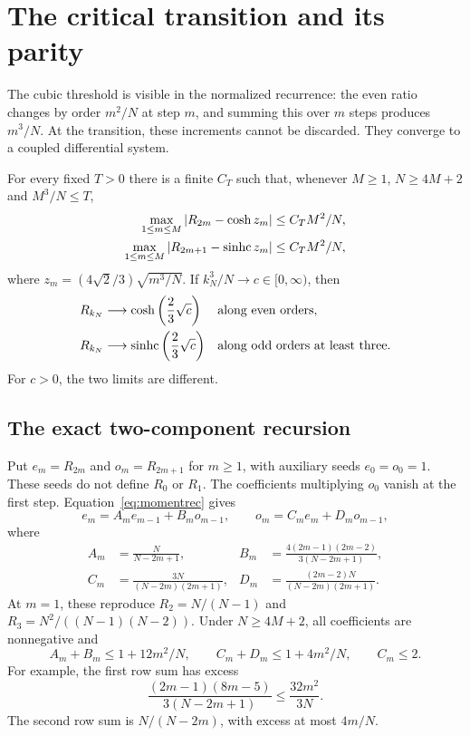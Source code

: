 \section{The critical transition and its parity}\label{sec:critical}

The cubic threshold is visible in the normalized recurrence: the even ratio changes by order $m^2/N$ at step $m$, and summing this over $m$ steps produces $m^3/N$. At the transition, these increments cannot be discarded. They converge to a coupled differential system.

\begin{theorem}\label{thm:critical}
For every fixed $T>0$ there is a finite $C_T$ such that, whenever $M\ge1$, $N\ge4M+2$ and $M^3/N\le T$,
\begin{align}
\max_{1\le m\le M}\left|R_{2m}-\cosh z_m\right|&\le C_T M^2/N,\label{eq:criticeven}\\
\max_{1\le m\le M}\left|R_{2m+1}-\operatorname{sinhc} z_m\right|&\le C_T M^2/N,\label{eq:criticodd}
\end{align}
where $z_m=(4\sqrt2/3)\sqrt{m^3/N}$. If $k_N^3/N\to c\in[0,\infty)$, then
\begin{align*}
R_{k_N}&\longrightarrow\cosh\left(\frac23\sqrt c\right)
&&\text{along even orders},\\
R_{k_N}&\longrightarrow\operatorname{sinhc}\left(\frac23\sqrt c\right)
&&\text{along odd orders at least three}.
\end{align*}
For $c>0$, the two limits are different.
\end{theorem}

\subsection{The exact two-component recursion}

Put $e_m=R_{2m}$ and $o_m=R_{2m+1}$ for $m\ge1$, with auxiliary seeds $e_0=o_0=1$. These seeds do not define $R_0$ or $R_1$. The coefficients multiplying $o_0$ vanish at the first step. Equation~\eqref{eq:momentrec} gives
\begin{equation}\label{eq:tworec}
e_m=A_me_{m-1}+B_mo_{m-1},\qquad
o_m=C_me_m+D_mo_{m-1},
\end{equation}
where
\begin{align*}
A_m&=\frac N{N-2m+1},&
B_m&=\frac{4(2m-1)(2m-2)}{3(N-2m+1)},\\
C_m&=\frac{3N}{(N-2m)(2m+1)},&
D_m&=\frac{(2m-2)N}{(N-2m)(2m+1)}.
\end{align*}
At $m=1$, these reproduce $R_2=N/(N-1)$ and $R_3=N^2/((N-1)(N-2))$. Under $N\ge4M+2$, all coefficients are nonnegative and
\begin{equation}\label{eq:rowsums}
A_m+B_m\le1+12m^2/N,\qquad
C_m+D_m\le1+4m^2/N,\qquad C_m\le2.
\end{equation}
For example, the first row sum has excess
\[
\frac{(2m-1)(8m-5)}{3(N-2m+1)}\le\frac{32m^2}{3N}.
\]
The second row sum is $N/(N-2m)$, with excess at most $4m/N$.


